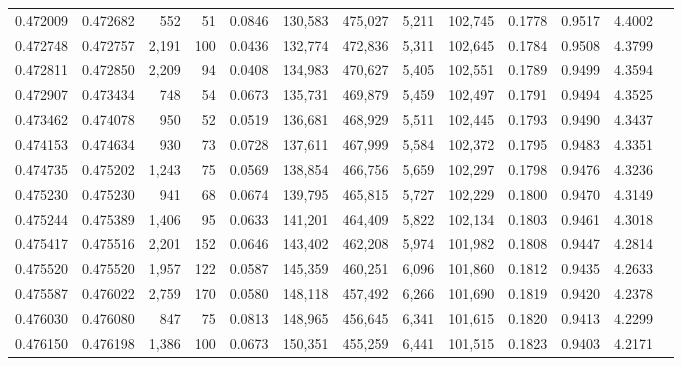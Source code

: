 \begin{tabular}{rrrrrrrrrrrrr}
0.472009 & 0.472682 &   552 &    51 &                                     0.0846 & 130,583 & 475,027 &   5,211 & 102,745 & 0.1778 & 0.9517 & 4.4002 \\
0.472748 & 0.472757 & 2,191 &   100 &                                     0.0436 & 132,774 & 472,836 &   5,311 & 102,645 & 0.1784 & 0.9508 & 4.3799 \\
0.472811 & 0.472850 & 2,209 &    94 &                                     0.0408 & 134,983 & 470,627 &   5,405 & 102,551 & 0.1789 & 0.9499 & 4.3594 \\
0.472907 & 0.473434 &   748 &    54 &                                     0.0673 & 135,731 & 469,879 &   5,459 & 102,497 & 0.1791 & 0.9494 & 4.3525 \\
0.473462 & 0.474078 &   950 &    52 &                                     0.0519 & 136,681 & 468,929 &   5,511 & 102,445 & 0.1793 & 0.9490 & 4.3437 \\
0.474153 & 0.474634 &   930 &    73 &                                     0.0728 & 137,611 & 467,999 &   5,584 & 102,372 & 0.1795 & 0.9483 & 4.3351 \\
0.474735 & 0.475202 & 1,243 &    75 &                                     0.0569 & 138,854 & 466,756 &   5,659 & 102,297 & 0.1798 & 0.9476 & 4.3236 \\
0.475230 & 0.475230 &   941 &    68 &                                     0.0674 & 139,795 & 465,815 &   5,727 & 102,229 & 0.1800 & 0.9470 & 4.3149 \\
0.475244 & 0.475389 & 1,406 &    95 &                                     0.0633 & 141,201 & 464,409 &   5,822 & 102,134 & 0.1803 & 0.9461 & 4.3018 \\
0.475417 & 0.475516 & 2,201 &   152 &                                     0.0646 & 143,402 & 462,208 &   5,974 & 101,982 & 0.1808 & 0.9447 & 4.2814 \\
0.475520 & 0.475520 & 1,957 &   122 &                                     0.0587 & 145,359 & 460,251 &   6,096 & 101,860 & 0.1812 & 0.9435 & 4.2633 \\
0.475587 & 0.476022 & 2,759 &   170 &                                     0.0580 & 148,118 & 457,492 &   6,266 & 101,690 & 0.1819 & 0.9420 & 4.2378 \\
0.476030 & 0.476080 &   847 &    75 &                                     0.0813 & 148,965 & 456,645 &   6,341 & 101,615 & 0.1820 & 0.9413 & 4.2299 \\
0.476150 & 0.476198 & 1,386 &   100 &                                     0.0673 & 150,351 & 455,259 &   6,441 & 101,515 & 0.1823 & 0.9403 & 4.2171 \\

\end{tabular}
